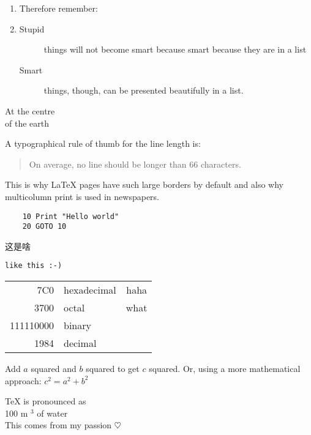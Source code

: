 \documentclass[a4paper, 11pt]{article}
\begin{document}
\flushleft
\begin{enumerate}
    environments to your taste:
\begin{itemize}
    \item But it might start to look silly.
    \item [-] With a dash.
\end{itemize}
    \item Therefore remember:
    \item 
    \begin{description}
    \item[Stupid] things will not become smart because 
        smart because they are in a list
    \item[Smart] things, though, can be 
    presented beautifully in a list.
        
        
    \end{description}

\end{enumerate}

\begin{center}
    At the centre \\ of the earth
\end{center}

A typographical rule of thumb
for the line length is:
\begin{quote}
    On average, no line should 
    be longer than 66 characters.
\end{quote}
This is why \LaTeX{} pages have
such large borders by default
and also why multicolumn print is
used in newspapers.

\begin{verbatim}
    10 Print "Hello world"
    20 GOTO 10
\end{verbatim}
\begin{verbatim*}
    这是啥
\end{verbatim*}
\verb|like this :-) |

\begin{tabular}{|r|l|c|}
\hline
7C0 & hexadecimal & haha \\ 
3700 & octal & what \\ \cline{2-3}
111110000 & binary & \\
\hline \hline
1984 & decimal \\
\hline
\end{tabular}

\newpage

Add $a$ squared and $b$ squared to get
$c$ squared. Or, using a more mathematical 
approach: $c^{2}=a^{2}+b^{2}$

\TeX{} is pronounced as \\
100 m $^{3}$ of water \\[6pt]
This comes from my passion
\begin{math}\heartsuit\end{math}
\end{document}
